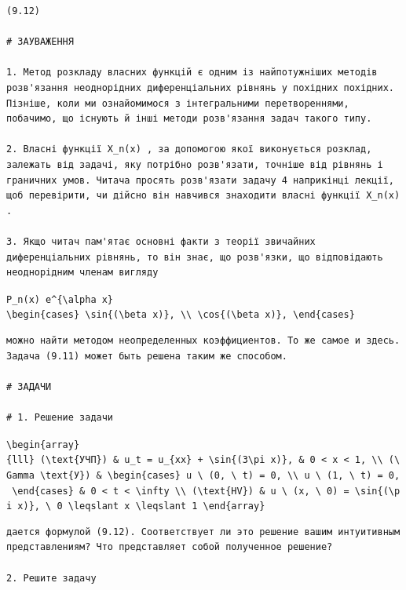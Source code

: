 \documentclass[
  ukrainian,
]{article}
\begin{document}
\begin{verbatim}
(9.12)

# ЗАУВАЖЕННЯ

1. Метод розкладу власних функцій є одним із найпотужніших методів розв'язання неоднорідних диференціальних рівнянь у похідних похідних. Пізніше, коли ми ознайомимося з інтегральними перетвореннями, побачимо, що існують й інші методи розв'язання задач такого типу.

2. Власні функції X_n(x) , за допомогою якої виконується розклад, залежать від задачі, яку потрібно розв'язати, точніше від рівнянь і граничних умов. Читача просять розв'язати задачу 4 наприкінці лекції, щоб перевірити, чи дійсно він навчився знаходити власні функції X_n(x) .

3. Якщо читач пам'ятає основні факти з теорії звичайних диференціальних рівнянь, то він знає, що розв'язки, що відповідають неоднорідним членам вигляду
\end{verbatim}

\texttt{P\_n(x)\ e\^{}\{\textbackslash{}alpha\ x\}}
\texttt{\textbackslash{}begin\{cases\}\ \textbackslash{}sin\{(\textbackslash{}beta\ x)\},\ \textbackslash{}\textbackslash{}\ \textbackslash{}cos\{(\textbackslash{}beta\ x)\},\ \textbackslash{}end\{cases\}}

\begin{verbatim}
можно найти методом неопределенных коэффициентов. То же самое и здесь. Задача (9.11) может быть решена таким же способом.

# ЗАДАЧИ

# 1. Решение задачи
\end{verbatim}

\texttt{\textbackslash{}begin\{array\}\{lll\}\ (\textbackslash{}text\{УЧП\})\ \&\ u\_t\ =\ u\_\{xx\}\ +\ \textbackslash{}sin\{(3\textbackslash{}pi\ x)\},\ \&\ 0\ \textless{}\ x\ \textless{}\ 1,\ \textbackslash{}\textbackslash{}\ (\textbackslash{}Gamma\ \textbackslash{}text\{У\})\ \&\ \textbackslash{}begin\{cases\}\ u\ \textbackslash{}\ (0,\ \textbackslash{}\ t)\ =\ 0,\ \textbackslash{}\textbackslash{}\ u\ \textbackslash{}\ (1,\ \textbackslash{}\ t)\ =\ 0,\ \textbackslash{}end\{cases\}\ \&\ 0\ \textless{}\ t\ \textless{}\ \textbackslash{}infty\ \textbackslash{}\textbackslash{}\ (\textbackslash{}text\{HV\})\ \&\ u\ \textbackslash{}\ (x,\ \textbackslash{}\ 0)\ =\ \textbackslash{}sin\{(\textbackslash{}pi\ x)\},\ \textbackslash{}\ 0\ \textbackslash{}leqslant\ x\ \textbackslash{}leqslant\ 1\ \textbackslash{}end\{array\}}

\begin{verbatim}
дается формулой (9.12). Соответствует ли это решение вашим интуитивным представлениям? Что представляет собой полученное решение?

2. Решите задачу
\end{verbatim}
\end{document}
